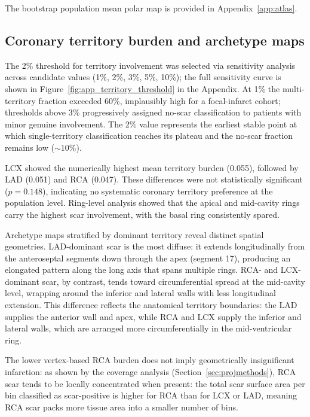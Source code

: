 The bootstrap population mean polar map is provided in Appendix~\ref{app:atlas}.

\subsection{Coronary territory burden and archetype maps}
\label{sec:terrburden}

The 2\% threshold for territory involvement was selected via sensitivity analysis across
candidate values (1\%, 2\%, 3\%, 5\%, 10\%); the full sensitivity curve is shown in
Figure~\ref{fig:app_territory_threshold} in the Appendix. At 1\% the multi-territory fraction
exceeded 60\%, implausibly high for a focal-infarct cohort; thresholds above 3\%
progressively assigned no-scar classification to patients with minor genuine involvement.
The 2\% value represents the earliest stable point at which single-territory classification
reaches its plateau and the no-scar fraction remains low (${\sim}10\%$).

LCX showed the numerically highest mean territory burden (0.055), followed by LAD (0.051)
and RCA (0.047). These differences were not statistically significant ($p = 0.148$), indicating no systematic coronary territory preference at the
population level. Ring-level analysis showed that the apical and mid-cavity rings carry the
highest scar involvement, with the basal ring consistently spared.

Archetype maps stratified by dominant territory reveal distinct spatial geometries. LAD-dominant
scar is the most diffuse: it extends longitudinally from the anteroseptal segments down through
the apex (segment 17), producing an elongated pattern along the long axis that spans multiple
rings. RCA- and LCX-dominant scar, by contrast, tends toward circumferential spread at the
mid-cavity level, wrapping around the inferior and lateral walls with less longitudinal extension.
This difference reflects the anatomical territory boundaries: the LAD supplies the anterior wall
and apex, while RCA and LCX supply the inferior and lateral walls, which are arranged more
circumferentially in the mid-ventricular ring.

The lower vertex-based RCA burden does not imply geometrically insignificant infarction:
as shown by the coverage analysis (Section~\ref{sec:projmethods}), RCA scar tends to be
locally concentrated when present: the total scar surface area per bin classified as
scar-positive is higher for RCA than for LCX or LAD, meaning RCA scar packs more tissue
area into a smaller number of bins.

